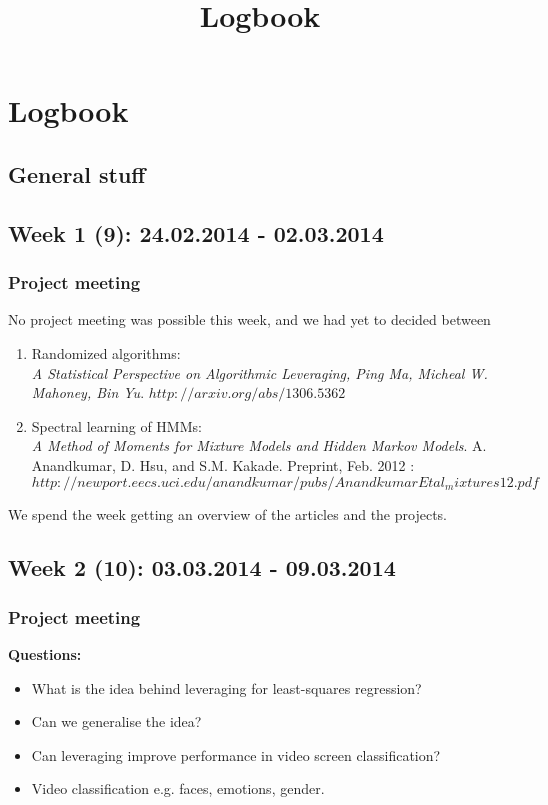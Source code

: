 \documentclass[11pt, a4paper]{article} %
\title{Logbook}
\begin{document}
\maketitle

\section*{Logbook}


\subsection*{General stuff}



\subsection*{Week 1 (9): 24.02.2014 - 02.03.2014}
\subsubsection*{Project meeting}
No project meeting was possible this week, and we had yet to decided between 
\begin{enumerate}
\item Randomized algorithms: \\
\emph{A Statistical Perspective on Algorithmic Leveraging, Ping Ma, Micheal W. Mahoney, Bin Yu}.  $http://arxiv.org/abs/1306.5362$
\item Spectral learning of HMMs:\\
\emph{A Method of Moments for Mixture Models and Hidden Markov Models}. A. Anandkumar, D. Hsu, and S.M. Kakade. Preprint, Feb. 2012 : $http://newport.eecs.uci.edu/anandkumar/pubs/AnandkumarEtal_mixtures12.pdf$
\end{enumerate}

We spend the week getting an overview of the articles and the projects.

\subsection*{Week 2 (10): 03.03.2014 - 09.03.2014}
\subsubsection*{Project meeting}
\textbf{Questions:}\\
\begin{itemize}
\item What is the idea behind leveraging for least-squares regression?
\item Can we generalise the idea?
\item Can leveraging improve performance in video screen classification?
\item Video classification e.g. faces, emotions, gender.
\end{itemize}
\end{document}
